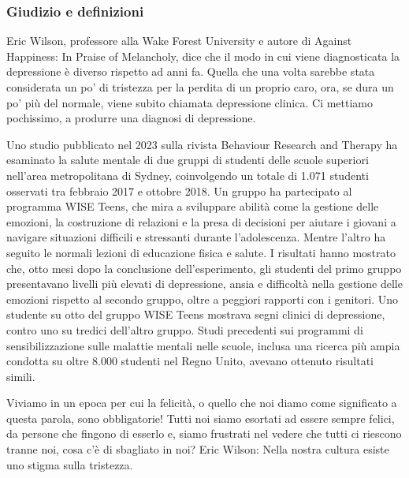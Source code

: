 \documentclass[12pt]{book} %
\begin{document}
\subsubsection{Giudizio e definizioni}
Eric Wilson, professore alla Wake Forest University e autore di Against Happiness: In Praise of Melancholy, dice che il
modo in cui viene diagnosticata la depressione è diverso rispetto ad anni fa. {\textquotedbl}Quella che una volta
sarebbe stata considerata un po' di tristezza per la perdita di un proprio caro, ora, se dura un po' più del normale,
viene subito chiamata depressione clinica. Ci mettiamo pochissimo, a produrre una diagnosi di
depressione.{\textquotedbl}

Uno studio pubblicato nel 2023 sulla rivista Behaviour Research and Therapy ha esaminato la salute mentale di due gruppi di studenti delle scuole superiori nell’area metropolitana di Sydney, coinvolgendo un totale di 1.071 studenti osservati tra febbraio 2017 e ottobre 2018. Un gruppo ha partecipato al programma WISE Teens, che mira a sviluppare abilità come la gestione delle emozioni, la costruzione di relazioni e la presa di decisioni per aiutare i giovani a navigare situazioni difficili e stressanti durante l’adolescenza. Mentre l’altro ha seguito le normali lezioni di educazione fisica e salute. I risultati hanno mostrato che, otto mesi dopo la conclusione dell’esperimento, gli studenti del primo gruppo presentavano livelli più elevati di depressione, ansia e difficoltà nella gestione delle emozioni rispetto al secondo gruppo, oltre a peggiori rapporti con i genitori. Uno studente su otto del gruppo WISE Teens mostrava segni clinici di depressione, contro uno su tredici dell’altro gruppo.
Studi precedenti sui programmi di sensibilizzazione sulle malattie mentali nelle scuole, inclusa una ricerca più ampia condotta su oltre 8.000 studenti nel Regno Unito, avevano ottenuto risultati simili.

\bigskip

Viviamo in un epoca per cui la felicità, o quello che noi diamo come significato a questa parola, sono obbligatorie!
Tutti noi siamo esortati ad essere sempre felici, da persone che fingono di esserlo e, siamo frustrati nel vedere che
tutti ci riescono tranne noi, cosa c'è di sbagliato in noi? Eric Wilson: {\textquotedbl}Nella
nostra cultura esiste uno stigma sulla tristezza.{\textquotedbl}
\end{document}
